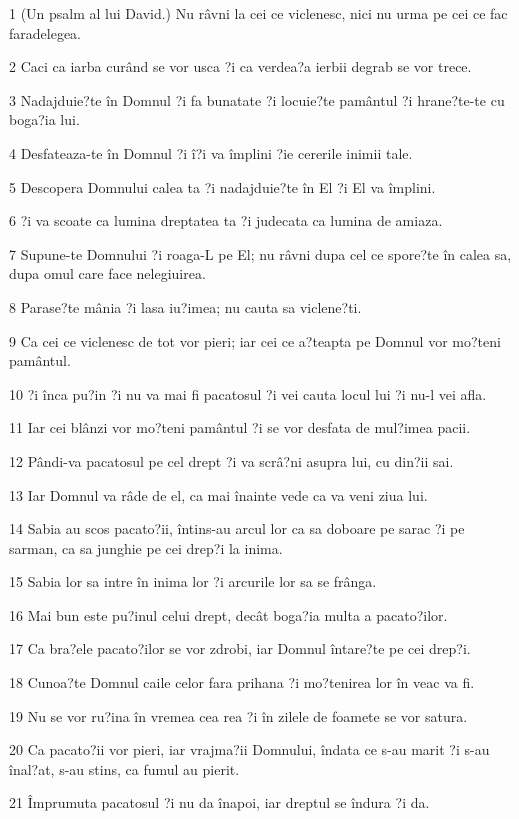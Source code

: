 \par 1 (Un psalm al lui David.) Nu râvni la cei ce viclenesc, nici nu urma pe cei ce fac faradelegea.
\par 2 Caci ca iarba curând se vor usca ?i ca verdea?a ierbii degrab se vor trece.
\par 3 Nadajduie?te în Domnul ?i fa bunatate ?i locuie?te pamântul ?i hrane?te-te cu boga?ia lui.
\par 4 Desfateaza-te în Domnul ?i î?i va împlini ?ie cererile inimii tale.
\par 5 Descopera Domnului calea ta ?i nadajduie?te în El ?i El va împlini.
\par 6 ?i va scoate ca lumina dreptatea ta ?i judecata ca lumina de amiaza.
\par 7 Supune-te Domnului ?i roaga-L pe El; nu râvni dupa cel ce spore?te în calea sa, dupa omul care face nelegiuirea.
\par 8 Parase?te mânia ?i lasa iu?imea; nu cauta sa viclene?ti.
\par 9 Ca cei ce viclenesc de tot vor pieri; iar cei ce a?teapta pe Domnul vor mo?teni pamântul.
\par 10 ?i înca pu?in ?i nu va mai fi pacatosul ?i vei cauta locul lui ?i nu-l vei afla.
\par 11 Iar cei blânzi vor mo?teni pamântul ?i se vor desfata de mul?imea pacii.
\par 12 Pândi-va pacatosul pe cel drept ?i va scrâ?ni asupra lui, cu din?ii sai.
\par 13 Iar Domnul va râde de el, ca mai înainte vede ca va veni ziua lui.
\par 14 Sabia au scos pacato?ii, întins-au arcul lor ca sa doboare pe sarac ?i pe sarman, ca sa junghie pe cei drep?i la inima.
\par 15 Sabia lor sa intre în inima lor ?i arcurile lor sa se frânga.
\par 16 Mai bun este pu?inul celui drept, decât boga?ia multa a pacato?ilor.
\par 17 Ca bra?ele pacato?ilor se vor zdrobi, iar Domnul întare?te pe cei drep?i.
\par 18 Cunoa?te Domnul caile celor fara prihana ?i mo?tenirea lor în veac va fi.
\par 19 Nu se vor ru?ina în vremea cea rea ?i în zilele de foamete se vor satura.
\par 20 Ca pacato?ii vor pieri, iar vrajma?ii Domnului, îndata ce s-au marit ?i s-au înal?at, s-au stins, ca fumul au pierit.
\par 21 Împrumuta pacatosul ?i nu da înapoi, iar dreptul se îndura ?i da.
